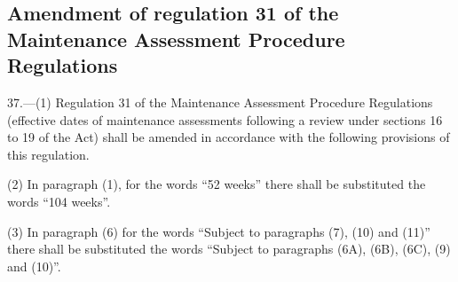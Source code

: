 \documentclass[a4paper]{article}
\begin{document}
\subsection[37. Amendment of regulation 31 of the Maintenance Assessment Procedure Regulations]{Amendment of regulation 31 of the Maintenance Assessment Procedure Regulations}

37.—(1) Regulation 31 of the Maintenance Assessment Procedure Regulations (effective dates of maintenance assessments following a review under sections 16 to 19 of the Act) shall be amended in accordance with the following provisions of this regulation.

(2) In paragraph (1), for the words “52 weeks” there shall be substituted the words “104 weeks”.

(3) In paragraph (6) for the words “Subject to paragraphs (7), (10) and (11)” there shall be substituted the words “Subject to paragraphs (6A), (6B), (6C), (9) and (10)”.
\end{document}
